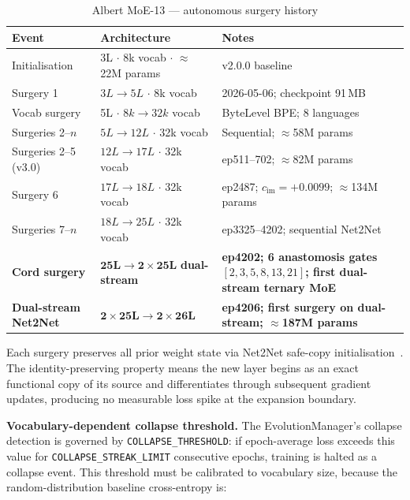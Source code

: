 \documentclass[11pt,a4paper]{article}
\begin{document}
\begin{table}[htbp]
\centering
\small
\caption{Albert MoE-13 --- autonomous surgery history}
\label{tab:surgery}
\begin{tabular}{@{}l l p{}@{}}
\toprule
Event & Architecture & Notes \\
\midrule
Initialisation & 3L $\cdot$ 8k vocab $\cdot$ $\approx$22M params & v2.0.0 baseline \\
Surgery 1 & $3L \to 5L$ $\cdot$ 8k vocab & 2026-05-06; checkpoint 91\,MB \\
Vocab surgery & 5L $\cdot$ $8k \to 32k$ vocab & ByteLevel BPE; 8 languages \\
Surgeries 2--$n$ & $5L \to 12L$ $\cdot$ 32k vocab & Sequential; $\approx$58M params \\
Surgeries 2--5 (v3.0) & $12L \to 17L$ $\cdot$ 32k vocab & ep511--702; $\approx$82M params \\
Surgery 6 & $17L \to 18L$ $\cdot$ 32k vocab & ep2487; $c_\text{im}{=}{+}0.0099$; $\approx$134M params \\
Surgeries 7--$n$ & $18L \to 25L$ $\cdot$ 32k vocab & ep3325--4202; sequential Net2Net \\
\textbf{Cord surgery} & $\mathbf{25L \to 2{\times}25L}$ \textbf{dual-stream} & \textbf{ep4202; 6 anastomosis gates $[2,3,5,8,13,21]$; first dual-stream ternary MoE} \\
\textbf{Dual-stream Net2Net} & $\mathbf{2{\times}25L \to 2{\times}26L}$ & \textbf{ep4206; first surgery on dual-stream; $\approx$187M params} \\
\bottomrule
\end{tabular}
\end{table}

Each surgery preserves all prior weight state via Net2Net safe-copy
initialisation~\cite{chen2016net2net}. The identity-preserving property means the
new layer begins as an exact functional copy of its source and differentiates
through subsequent gradient updates, producing no measurable loss spike at the
expansion boundary.

\textbf{Vocabulary-dependent collapse threshold.} The EvolutionManager's collapse
detection is governed by \texttt{COLLAPSE\allowbreak\_THRESHOLD}: if epoch-average loss
exceeds this value for \texttt{COLLAPSE\allowbreak\_STREAK\allowbreak\_LIMIT} consecutive epochs,
training is halted as a collapse event. This threshold must be calibrated to
vocabulary size, because the random-distribution baseline cross-entropy is:
\end{document}
